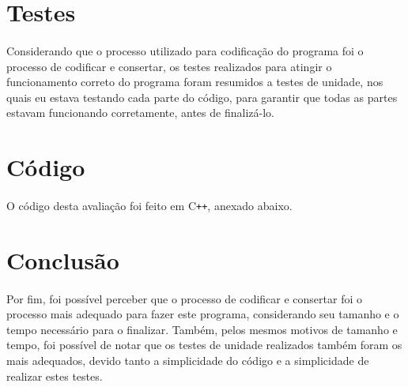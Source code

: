 \documentclass{article}
\begin{document}
\section{Testes}
\paragraph{} Considerando que o processo utilizado para codificação do programa foi o processo de codificar e consertar, os testes realizados para atingir o funcionamento correto do programa foram resumidos a testes de unidade, nos quais eu estava testando cada parte do código, para garantir que todas as partes estavam funcionando corretamente, antes de finalizá-lo. 

\section{Código}
\paragraph{} O código desta avaliação foi feito em C\texttt{++}, anexado abaixo.



\section{Conclusão}
\paragraph{} Por fim, foi possível perceber que o processo de codificar e consertar foi o processo mais adequado para fazer este programa, considerando seu tamanho e o tempo necessário para o finalizar. Também, pelos mesmos motivos de tamanho e tempo, foi possível de notar que os testes de unidade realizados também foram os mais adequados, devido tanto a simplicidade do código e a simplicidade de realizar estes testes.
\end{document}
